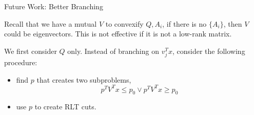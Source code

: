 \documentclass[aspectratio=1610, 9pt]{beamer}
\begin{document}
\begin{frame}[allowframebreaks]{Future Work: Better Branching}

  Recall that we have a mutual \(V\) to convexify \({Q, A_i}\), if there is no \(\{A_i\}\), then \(V\) could be eigenvectors. This is not effective if it is not a low-rank matrix.

  We first consider \(Q\) only. Instead of branching on \(v_j^T x\), consider the following procedure:
  \begin{itemize}
    \item find \(p\) that creates two subproblems,
          \[p^TV^Tx \le p_0 \vee  p^TV^Tx \ge p_0\]
    \item use \(p\) to create RLT cuts.
  \end{itemize}



\end{frame}
\end{document}
